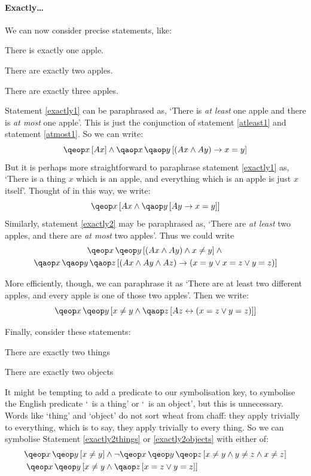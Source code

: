 \documentclass[PHIL101-Textbook.tex]{subfiles}
\begin{document}
\pagebreak


\paragraph{Exactly\ldots}
We can now consider precise statements, like:
\begin{earg}
\item[\ex{exactly1}] There is exactly one apple.
\item[\ex{exactly2}] There are exactly two apples.
\item[\ex{exactly3}] There are exactly three apples.
\end{earg}
Statement \ref{exactly1} can be paraphrased as, `There is \emph{at least} one apple and there is \emph{at most} one apple'. This is just the conjunction of statement \ref{atleast1} and statement \ref{atmost1}. So we can write:
$$\qeb{x}{\atom A x } \eand \qa{x}{\qab{y}{(\atom A x  \eand \atom A y ) \eif x=y}}$$
But it is perhaps more straightforward to paraphrase statement \ref{exactly1} as, `There is a thing $x$ which is an apple, and everything which is an apple is just $x$ itself'. Thought of in this way, we write: 
\[
	\qeb{x}{\atom A x  \eand \qab{y}{\atom A y  \eif x= y}}
\]
Similarly, statement \ref{exactly2} may be paraphrased as, `There are \emph{at least} two apples, and there are \emph{at most} two apples'. Thus we could write 
\begin{multline*}
  \qe{x}{\qeb{y}{(\atom A x  \eand \atom A y ) \eand x\neq y}} \eand {}\\
  \qa{x}{\qa{y}{\qab{z}{(\atom A x  \eand \atom A y  \eand \atom A z ) \eif (x=y \eor x=z \eor y=z)}}}
\end{multline*}

More efficiently, though, we can paraphrase it as `There are at least two different apples, and every apple is one of those two apples'. Then we write:
$$\qe{x}{\qeb{y}{ x\neq y \eand \qab{z}{\atom A z  \eiff ( x= z \eor y = z)}}}$$

Finally, consider these statements:

\begin{earg}
\item[\ex{exactly2things}] There are exactly two things
\item[\ex{exactly2objects}] There are exactly two objects
\end{earg}
It might be tempting to add a predicate to our symbolisation key, to symbolise the English predicate `\blank\ is a thing' or `\blank\ is an object', but this is unnecessary. Words like `thing' and `object' do not sort wheat from chaff: they apply trivially to everything, which is to say, they apply trivially to every thing. So we can symbolise Statement \ref{exactly2things} or \ref{exactly2objects} with either of:
	\begin{align*}
		\qe{x}{\qeb{y}{x\neq y}} & \eand  \enot \qe{x}{\qe{y}{\qeb{z}{x\neq y \eand y \neq z \eand x \neq z}}} \\
		\qe{x}{\qeb{y}{x\neq y & \eand \qab{z}{x=z \eor y = z}}}
	\end{align*}
\end{document}
